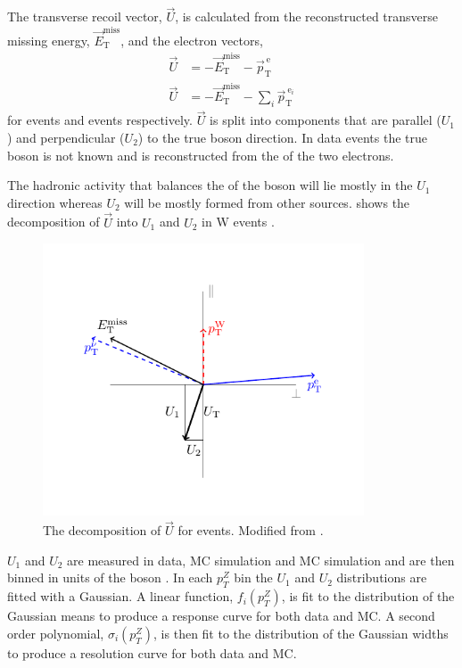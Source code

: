 The transverse recoil vector, $\vec{U}$, is calculated from the reconstructed
transverse missing energy, $\vec{E}_{\mathrm{T}}^{\mathrm{miss}}$, and the
electron \pT vectors,
\begin{align}
\vec{U} &= - \vec{E}_{\mathrm{T}}^{\mathrm{miss}} 
      - \vec{p}^{\ \mathrm{e}}_{\mathrm{T}}\\
\vec{U} &= - \vec{E}_{\mathrm{T}}^{\mathrm{miss}} 
      - \sum_i \vec{p}^{\ \mathrm{e}_i}_{\mathrm{T}}
\end{align}
for \PW events and \PZ events respectively. $\vec{U}$ is split into components
that are parallel ($U_1$) and perpendicular ($U_2$) to the true boson \pT
direction. 
In \PZ data events the true boson \pT is not known and is reconstructed from the
\pT of the two electrons.

The hadronic activity that balances the \pT of the boson will lie mostly in the
$U_1$ direction whereas $U_2$ will be mostly formed from other sources.
 shows the decomposition of $\vec{U}$ into $U_1$ and
$U_2$ in W events \cite{bauer2010modeling}.
\begin{figure}
  \begin{center}
    \includegraphics*[width=0.85\textwidth]{recoil}
    \caption[The decomposition of $\vec{U}$ for \PW events.] {The decomposition
of $\vec{U}$ for \PW events. Modified from \cite{bauer2010modeling}.}
    \label{fig:recoil}
  \end{center}
\end{figure}

$U_1$ and $U_2$ are measured in \PZ data, \PZ MC simulation and \PW MC
simulation and are then binned in units of the boson \pT.  In each $p_T^{Z}$ bin
the $U_1$ and $U_2$ distributions are fitted with a Gaussian.  A linear function,
$f_i(p_T^Z)$, is fit to the distribution of the Gaussian means to produce a
response curve for both data and MC.  A second order polynomial,
$\sigma_i(p_T^Z)$, is then fit to the distribution of the Gaussian widths to
produce a resolution curve for both data and MC\cite{bauer2010modeling}.

